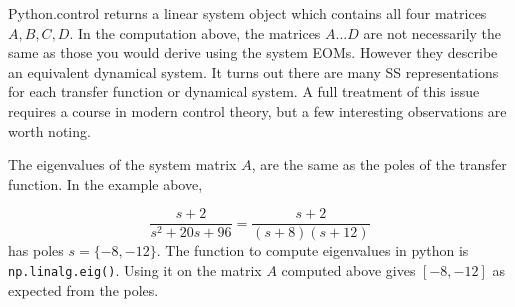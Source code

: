 %

Python.control returns a linear system object which contains all four matrices $A,B,C,D$.
In the computation above, the matrices $A \dots D$ are not necessarily the same as those you would
derive using the system EOMs.   However they describe an equivalent dynamical system.  It turns
out there are many SS representations for each transfer function or dynamical system.
A full treatment of this issue requires a course in modern control theory, but a few interesting
observations are worth noting.

The eigenvalues of the system matrix $A$, are the same as the poles of the transfer function.
In the example above,

\[
\frac{s+2}{s^2+20s+96} = \frac{s+2}{(s+8)(s+12)}
\]
has poles $s=\{-8,-12\}$.    The function to compute eigenvalues in python is {\tt np.linalg.eig()}.  Using
it on the matrix $A$ computed above gives $[-8, -12]$ as expected from the poles.
